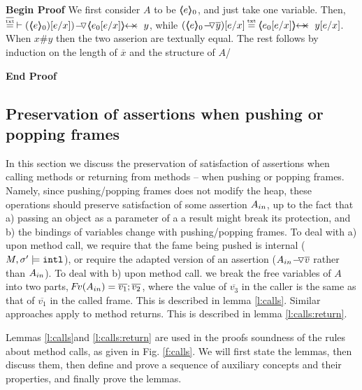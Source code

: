 \noindent
\textbf{Begin Proof}
We first consider $A$ to be $\langle\!\!\langle e \rangle\!\!\rangle_0$, and just take one variable. Then, $\PushA {y} {(\inside e_0)[{e/x}])} \txteq \protectedFrom {e_0[ {e/x}]} {y}$, while
$(\PushAS {y} {\inside e_0})[{ e/x}]  \txteq \protectedFrom {e_0[{e/x}]} {y[ {e/x}]}$. When $x \# y$  then the two asserion are textually equal.
The rest follows by induction on the length of $\overline x$ and the structure of $A$/
 

\noindent
\textbf{End Proof}




\subsection{Preservation of assertions when pushing or popping frames}

In this section we  discuss the preservation of satisfaction of assertions when calling methods or returning from methods -- \ie when pushing or popping  frames. 
Namely, since  pushing/popping frames  does not modify the heap, these operations should preserve satisfaction of some assertion $A_{in}$, up to the fact that a) passing an object as a parameter of a a result might break its protection, and 
b) the bindings of variables change  with pushing/popping frames.
To deal with a)  upon method call, 
we   require that the fame being pushed is internal ($M, \sigma' \models \mbox{\normalfont{\texttt{intl}}}$), or require the adapted version of an assertion (\ie  ${ { A_{in}} \!-\!\!\!\,\!{\triangledown} \overline{v} }$ rather than $A_{in}$).
To deal with b)  upon method call. 
we break the free variables of $A$ into two parts, \ie ${\hspace{-1pt}F\hspace{-1pt}}v(A_{in}) =  \overline{v_1};\overline{v_2}$, where the value of $\overline{v_3}$ in the caller is the same as that of  $\overline{v_1}$ in the called frame.
This   is described in  lemma \ref{l:calls}.
Similar approaches apply to method returns. This   is described in  lemma \ref{l:calls:return}.

Lemmas \ref{l:calls}and  \ref{l:calls:return} are used in the proofs soundness of the rules about method calls, as given in Fig. \ref{f:calls}. 
We will first state  the lemmas,
then discuss them,   then    define and prove a sequence of auxiliary concepts and 
their properties, and finally prove the lemmas. 
 
